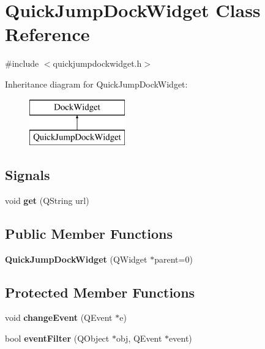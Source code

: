\hypertarget{classQuickJumpDockWidget}{
\section{QuickJumpDockWidget Class Reference}
\label{classQuickJumpDockWidget}
}


{\ttfamily \#include $<$quickjumpdockwidget.h$>$}

Inheritance diagram for QuickJumpDockWidget:\begin{figure}[H]
\begin{center}
\leavevmode
\includegraphics[height=2cm]{classQuickJumpDockWidget}
\end{center}
\end{figure}
\subsection*{Signals}
\begin{DoxyCompactItemize}
\item 
\hypertarget{classQuickJumpDockWidget_a770ffde4892f3c10d8c3de3f4aa252ae}{
void {\bfseries get} (QString url)}
\label{classQuickJumpDockWidget_a770ffde4892f3c10d8c3de3f4aa252ae}

\end{DoxyCompactItemize}
\subsection*{Public Member Functions}
\begin{DoxyCompactItemize}
\item 
\hypertarget{classQuickJumpDockWidget_ac079931f37c726d0a70801ca3b1d8bf7}{
{\bfseries QuickJumpDockWidget} (QWidget $\ast$parent=0)}
\label{classQuickJumpDockWidget_ac079931f37c726d0a70801ca3b1d8bf7}

\end{DoxyCompactItemize}
\subsection*{Protected Member Functions}
\begin{DoxyCompactItemize}
\item 
\hypertarget{classQuickJumpDockWidget_abba1b097edbb75d5fbf798036d68aeaa}{
void {\bfseries changeEvent} (QEvent $\ast$e)}
\label{classQuickJumpDockWidget_abba1b097edbb75d5fbf798036d68aeaa}

\item 
\hypertarget{classQuickJumpDockWidget_af688adab679a602d59b5f53af0551d9e}{
bool {\bfseries eventFilter} (QObject $\ast$obj, QEvent $\ast$event)}
\label{classQuickJumpDockWidget_af688adab679a602d59b5f53af0551d9e}

\end{DoxyCompactItemize}



